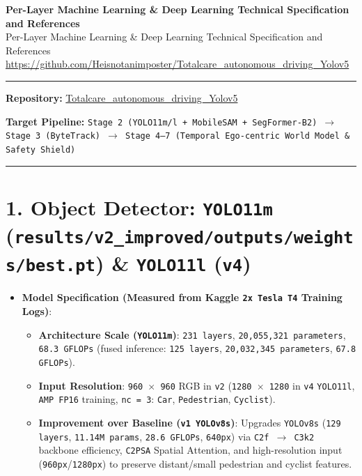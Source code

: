 \documentclass[10.5pt,a4paper]{article}
\begin{document}
\begin{center}
{\LARGE\bfseries Per-Layer Machine Learning \& Deep Learning Technical Specification and References}\\[6pt]
{\normalsize\color{gray} Per-Layer Machine Learning \& Deep Learning Technical Specification and References}\\[4pt]
{\small\href{https://github.com/Heisnotanimposter/Totalcare_autonomous_driving_Yolov5}{https://github.com/Heisnotanimposter/Totalcare\_autonomous\_driving\_Yolov5}}
\end{center}
\vspace{4pt}
\hrule
\vspace{8pt}

\textbf{Repository:} \href{https://github.com/Heisnotanimposter/Totalcare\_autonomous\_driving\_Yolov5}{Totalcare\_autonomous\_driving\_Yolov5}

\textbf{Target Pipeline:} \texttt{Stage 2 (YOLO11m/\allowbreak{}l + MobileSAM + SegFormer-\allowbreak{}B2) $\rightarrow$ Stage 3 (ByteTrack) $\rightarrow$ Stage 4--7 (Temporal Ego-\allowbreak{}centric World Model \& Safety Shield)}


\par\noindent\rule{\textwidth}{0.4pt}\par\medskip

\section{1. Object Detector: \texttt{YOLO11m} (\texttt{results/\allowbreak{}v2\_\allowbreak{}improved/\allowbreak{}outputs/\allowbreak{}weights/\allowbreak{}best.\allowbreak{}pt}) \& \texttt{YOLO11l} (\texttt{v4})}

\begin{itemize}[leftmargin=1.5em,itemsep=2pt]
\item \textbf{Model Specification (Measured from Kaggle \texttt{2x Tesla T4} Training Logs)}:
\begin{itemize}[leftmargin=1.5em,itemsep=2pt]
\item \textbf{Architecture Scale (\texttt{YOLO11m})}: \texttt{231 layers}, \texttt{20,\allowbreak{}055,\allowbreak{}321 parameters}, \texttt{68.\allowbreak{}3 GFLOPs} (fused inference: \texttt{125 layers}, \texttt{20,\allowbreak{}032,\allowbreak{}345 parameters}, \texttt{67.\allowbreak{}8 GFLOPs}).
\item \textbf{Input Resolution}: \texttt{960 $\times$ 960} RGB in \texttt{v2} (\texttt{1280 $\times$ 1280} in \texttt{v4} \texttt{YOLO11l}, \texttt{AMP FP16} training, \texttt{nc = 3}: \texttt{Car}, \texttt{Pedestrian}, \texttt{Cyclist}).
\item \textbf{Improvement over Baseline (\texttt{v1 YOLOv8s})}: Upgrades \texttt{YOLOv8s} (\texttt{129 layers}, \texttt{11.\allowbreak{}14M params}, \texttt{28.\allowbreak{}6 GFLOPs}, \texttt{640px}) via \texttt{C2f $\rightarrow$ C3k2} backbone efficiency, \texttt{C2PSA} Spatial Attention, and high-resolution input (\texttt{960px}/\texttt{1280px}) to preserve distant/small pedestrian and cyclist features.
\end{itemize}
\end{itemize}
\end{document}
